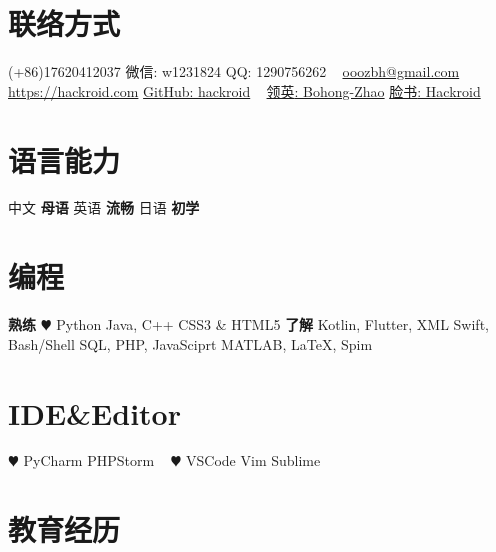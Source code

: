 \documentclass[hidelinks__VERSION__]{adamyi-cv}
\begin{document}



\begin{aside} %
\section{\heir 联络方式}
(+86)17620412037
{\hei 微信\textrm{: w1231824}}
{\hei QQ\textrm{: 1290756262}}
~
\href{mailto:ooozbh@gmail.com}{ooozbh@gmail.com}
\href{https://hackroid.com}{https://hackroid.com}
\href{https://github.com/hackroid}{GitHub: hackroid}
~
\href{https://www.linkedin.com/in/%E5%8D%9A%E5%BC%98-%E8%B5%B5-b7ab09136/}{\hei 领英\textrm{: Bohong-Zhao}}
\href{https://www.facebook.com/Hackro1d}{\hei 脸书\textrm{: Hackroid}}
\section{\heir 语言能力}
{\hei 中文 \textbf{\hei 母语}
\hei 英语 \textbf{\hei 流畅}
\hei 日语 \textbf{\hei 初学}}
\section{\heir 编程}
\textbf{\hei 熟练}
{\color{red} $\varheart$} Python
Java, C++
CSS3 \& HTML5
\textbf{\hei 了解}
Kotlin, Flutter, XML
Swift, Bash/Shell
SQL, PHP, JavaSciprt
MATLAB, \LaTeX, Spim
\section{IDE\&Editor}
{\color{red} $\varheart$} PyCharm
PHPStorm
~
{\color{red} $\varheart$} VSCode
Vim
Sublime
\versionsection
\end{aside}


\section{\heir 教育\heir 经历}
\end{document}
